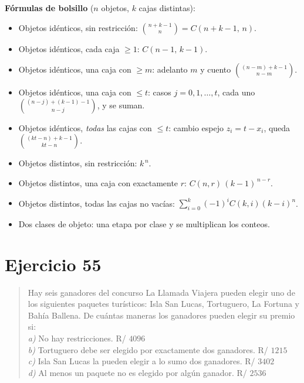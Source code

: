 \documentclass[11pt]{article}
\begin{document}
\begin{tip}
\textbf{Fórmulas de bolsillo} ($n$ objetos, $k$ cajas distintas):
\begin{itemize}[leftmargin=1.2cm]
  \item Objetos idénticos, sin restricción: $\binom{n+k-1}{n}=C(n+k-1,\,n)$.
  \item Objetos idénticos, cada caja $\ge 1$: $C(n-1,\,k-1)$.
  \item Objetos idénticos, una caja con $\ge m$: adelanto $m$ y cuento $\binom{(n-m)+k-1}{n-m}$.
  \item Objetos idénticos, una caja con $\le t$: casos $j=0,1,\dots,t$, cada uno $\binom{(n-j)+(k-1)-1}{n-j}$, y se suman.
  \item Objetos idénticos, \emph{todas} las cajas con $\le t$: cambio espejo $z_i=t-x_i$, queda $\binom{(kt-n)+k-1}{kt-n}$.
  \item Objetos distintos, sin restricción: $k^{\,n}$.
  \item Objetos distintos, una caja con exactamente $r$: $C(n,r)\,(k-1)^{\,n-r}$.
  \item Objetos distintos, todas las cajas no vacías: $\sum_{i=0}^{k}(-1)^i C(k,i)(k-i)^n$.
  \item Dos clases de objeto: una etapa por clase y se multiplican los conteos.
\end{itemize}
\end{tip}

\section*{Ejercicio 55}

\begin{quote}
Hay seis ganadores del concurso La Llamada Viajera pueden elegir uno de los siguientes paquetes turísticos: Isla San Lucas, Tortuguero, La Fortuna y Bahía Ballena. De cuántas maneras los ganadores pueden elegir su premio si:\\
\textit{a)} No hay restricciones. \hfill R/ $4096$\\
\textit{b)} Tortuguero debe ser elegido por exactamente dos ganadores. \hfill R/ $1215$\\
\textit{c)} Isla San Lucas la pueden elegir a lo sumo dos ganadores. \hfill R/ $3402$\\
\textit{d)} Al menos un paquete no es elegido por algún ganador. \hfill R/ $2536$
\end{quote}
\end{document}
